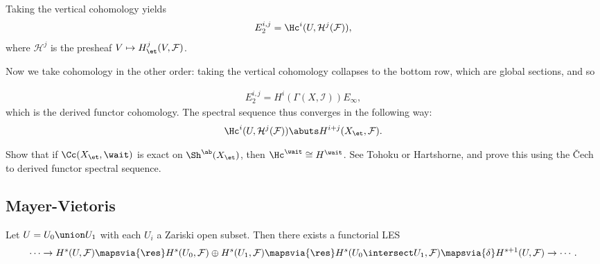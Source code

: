 Taking the vertical cohomology yields
\begin{align*}  
E_2^{i, j} = \Hc^i(U, \mathcal{H}^j(\mathcal{F}))
,\end{align*} where \(\mathcal{H}^j\) is the presheaf
\(V\mapsto H_\et^j(V, \mathcal{F})\).

Now we take cohomology in the other order: taking the vertical
cohomology collapses to the bottom row, which are global sections, and
so

\begin{align*}  
E_2^{i, j} = H^i(\Gamma(X, \mathcal{I}))  E_{\infty}
,\end{align*} which is the derived functor cohomology. The spectral
sequence thus converges in the following way:
\begin{align*}  
\Hc^i(U, \mathcal{H}^j(\mathcal{F})) \abuts H^{i+j}(X_\et, \mathcal{F})
.\end{align*}

\begin{exercise}

Show that if \(\Cc(X_\et, \wait)\) is exact on \(\Sh^{\ab}(X_\et)\),
then \(\Hc^\wait \cong H^\wait\). See Tohoku or Hartshorne, and prove
this using the Čech to derived functor spectral sequence.

\end{exercise}

\hypertarget{mayer-vietoris}{%
\subsection{Mayer-Vietoris}\label{mayer-vietoris}}

\begin{proposition}[?]

Let \(U = U_0 \union U_1\) with each \(U_i\) a Zariski open subset. Then
there exists a functorial LES
\begin{align*}  
\cdots \to
H^s(U, \mathcal{F}) \mapsvia{\res} 
H^s(U_0, \mathcal{F}) \oplus H^s(U_1, \mathcal{F}) \mapsvia{\res} 
H^s(U_0 \intersect U_1, \mathcal{F}) \mapsvia{\delta}
H^{s+1}(U, \mathcal{F}) \to 
\cdots
.\end{align*}

\end{proposition}

